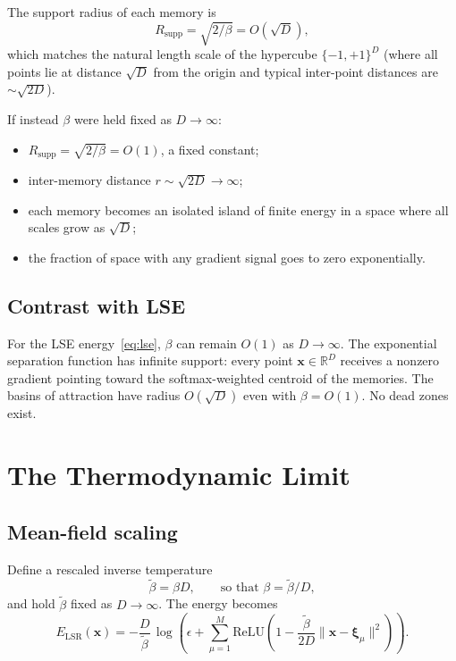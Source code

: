 \documentclass[11pt]{article}
\begin{document}
The support radius of each memory is
\begin{equation}
  R_{\mathrm{supp}} = \sqrt{2/\beta} = O(\sqrt{D}),
\end{equation}
which matches the natural length scale of the hypercube $\{-1,+1\}^D$
(where all points lie at distance $\sqrt{D}$ from the origin and typical
inter-point distances are $\sim\!\sqrt{2D}$).

If instead $\beta$ were held fixed as $D\to\infty$:
\begin{itemize}
  \item $R_{\mathrm{supp}} = \sqrt{2/\beta} = O(1)$, a fixed constant;
  \item inter-memory distance $r \sim \sqrt{2D} \to \infty$;
  \item each memory becomes an isolated island of finite energy in a space
        where all scales grow as $\sqrt{D}$;
  \item the fraction of space with any gradient signal goes to zero
        exponentially.
\end{itemize}

\subsection{Contrast with LSE}

For the LSE energy~\eqref{eq:lse}, $\beta$ can remain $O(1)$ as $D\to\infty$.
The exponential separation function has infinite support: every point
$\mathbf{x}\in\mathbb{R}^D$ receives a nonzero gradient pointing toward the
softmax-weighted centroid of the memories.  The basins of attraction have
radius $O(\sqrt{D})$ even with $\beta = O(1)$.  No dead zones exist.

\section{The Thermodynamic Limit}

\subsection{Mean-field scaling}

Define a rescaled inverse temperature
\begin{equation}
  \tilde\beta = \beta D, \qquad \text{so that } \beta = \tilde\beta/D,
\end{equation}
and hold $\tilde\beta$ fixed as $D\to\infty$.  The energy becomes
\begin{equation}
  E_{\mathrm{LSR}}(\mathbf{x})
  = -\frac{D}{\tilde\beta}\,\log\!\left(
      \epsilon + \sum_{\mu=1}^{M}
      \mathrm{ReLU}\!\left(
        1 - \frac{\tilde\beta}{2D}\|\mathbf{x}-\boldsymbol{\xi}_\mu\|^2
      \right)
    \right).
\end{equation}
\end{document}
